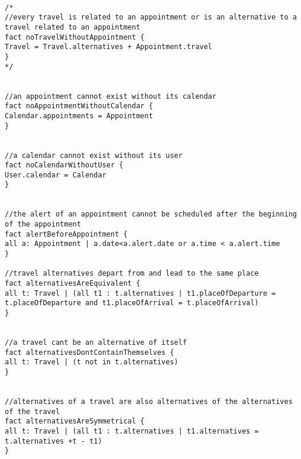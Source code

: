 \begin{lstlisting}

/*
//every travel is related to an appointment or is an alternative to a travel related to an appointment
fact noTravelWithoutAppointment {
Travel = Travel.alternatives + Appointment.travel
}
*/


//an appointment cannot exist without its calendar
fact noAppointmentWithoutCalendar {
Calendar.appointments = Appointment
}


//a calendar cannot exist without its user
fact noCalendarWithoutUser {
User.calendar = Calendar
}


//the alert of an appointment cannot be scheduled after the beginning of the appointment
fact alertBeforeAppointment {
all a: Appointment | a.date<a.alert.date or a.time < a.alert.time
}

//travel alternatives depart from and lead to the same place
fact alternativesAreEquivalent {
all t: Travel | (all t1 : t.alternatives | t1.placeOfDeparture = t.placeOfDeparture and t1.placeOfArrival = t.placeOfArrival)
}


//a travel cant be an alternative of itself
fact alternativesDontContainThemselves {
all t: Travel | (t not in t.alternatives)
}


//alternatives of a travel are also alternatives of the alternatives of the travel
fact alternativesAreSymmetrical {
all t: Travel | (all t1 : t.alternatives | t1.alternatives = t.alternatives +t - t1)
}

\end{lstlisting}
